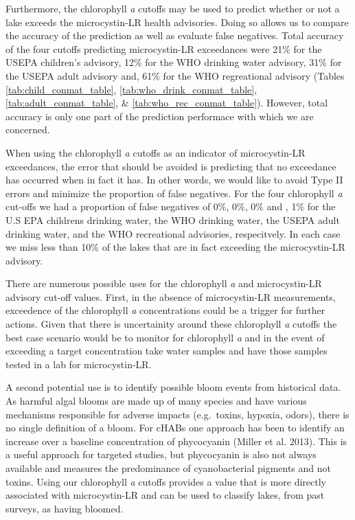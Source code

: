 \documentclass[11pt,]{article}
\begin{document}
Furthermore, the chlorophyll \emph{a} cutoffs may be used to predict
whether or not a lake exceeds the microcystin-LR health advisories.
Doing so allows us to compare the accuracy of the prediction as well as
evaluate false negatives. Total accuracy of the four cutoffs predicting
microcystin-LR exceedances were 21\% for the USEPA children's advisory,
12\% for the WHO drinking water advisory, 31\% for the USEPA adult
advisory and, 61\% for the WHO regreational advisory (Tables
\ref{tab:child_conmat_table}, \ref{tab:who_drink_conmat_table},
\ref{tab:adult_conmat_table}, \& \ref{tab:who_rec_conmat_table}).
However, total accuracy is only one part of the prediction performace
with which we are concerned.

When using the chlorophyll \emph{a} cutoffs as an indicator of
microcystin-LR exceedances, the error that should be avoided is
predicting that no exceedance has occurred when in fact it has. In other
words, we would like to avoid Type II errors and minimize the proportion
of false negatives. For the four chlorophyll \emph{a} cut-offs we had a
proportion of false negatives of 0\%, 0\%, 0\% and , 1\% for the U.S EPA
childrens drinking water, the WHO drinking water, the USEPA adult
drinking water, and the WHO recreational advisories, respecitvely. In
each case we miss less than 10\% of the lakes that are in fact exceeding
the microcystin-LR advisory.

There are numerous possible uses for the chlorophyll \emph{a} and
microcystin-LR advisory cut-off values. First, in the absence of
microcystin-LR measurements, exceedence of the chlorophyll \emph{a}
concentrations could be a trigger for further actions. Given that there
is uncertainity around these chlorophyll \emph{a} cutoffs the best case
scenario would be to monitor for chlorophyll \emph{a} and in the event
of exceeding a target concentration take water samples and have those
samples tested in a lab for microcystin-LR.

A second potential use is to identify possible bloom events from
historical data. As harmful algal blooms are made up of many species and
have various mechanisms responsible for adverse impacts (e.g.~toxins,
hypoxia, odors), there is no single definition of a bloom. For cHABs one
approach has been to identify an increase over a baseline concentration
of phycocyanin (Miller et al. 2013). This is a useful approach for
targeted studies, but phycocyanin is also not always available and
measures the predominance of cyanobacterial pigments and not toxins.
Using our chlorophyll \emph{a} cutoffs provides a value that is more
directly associated with microcystin-LR and can be used to classify
lakes, from past surveys, as having bloomed.
\end{document}
